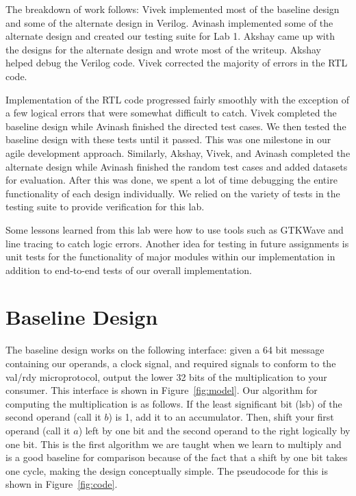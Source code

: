 \documentclass[11pt]{article}
\begin{document}
The breakdown of work follows:
Vivek implemented most of the baseline design and some of the alternate design in Verilog. 
Avinash implemented some of the alternate design and created our testing suite for Lab 1.
Akshay came up with the designs for the alternate design and wrote most of the writeup.
Akshay helped debug the Verilog code.
Vivek corrected the majority of errors in the RTL code.

Implementation of the RTL code progressed fairly smoothly with the exception of a few logical errors that were somewhat difficult to catch.
Vivek completed the baseline design while Avinash finished the directed test cases. We then tested the baseline design with these tests until it passed. This was one milestone in our agile development approach. Similarly, Akshay, Vivek, and Avinash completed the alternate design while Avinash finished the random test cases and added datasets for evaluation. After this was done, we spent a lot of time debugging the entire functionality of each design individually. We relied on the variety of tests in the testing suite to provide verification for this lab.

Some lessons learned from this lab were how to use tools such as GTKWave and line tracing to catch logic errors. 
Another idea for testing in future assignments is unit tests for the functionality of major modules within our implementation in addition to end-to-end tests of our overall implementation.

\section{Baseline Design}

The baseline design works on the following interface: 
given a 64 bit message containing our operands, a clock signal,
and required signals to conform to the val/rdy microprotocol,
output the lower 32 bits of the multiplication to your consumer.
This interface is shown in Figure~\ref{fig:model}.
Our algorithm for computing the multiplication is as follows.
If the least significant bit (lsb) of the second operand (call it $b$) is 1, add it to an accumulator.
Then, shift your first operand (call it $a$) left by one bit and the second operand to the right logically by one bit.
This is the first algorithm we are taught when we learn to multiply and is a good baseline for comparison because of the fact that a shift by one bit takes one cycle, making the design conceptually simple.
The pseudocode for this is shown in Figure~\ref{fig:code}. 
\end{document}
